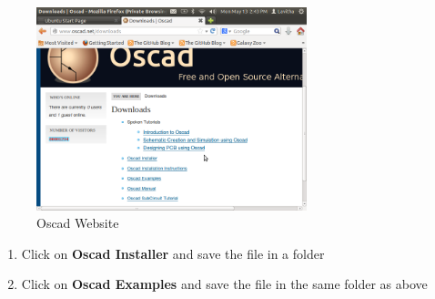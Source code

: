 \begin{figure}[h]
\centering
\includegraphics[width=0.7\textwidth]{figures/oscad1.png}
\caption{Oscad Website}
\label{fig: Oscad Website}
\end{figure}
\begin{enumerate}
\item Click on \textbf{Oscad Installer} and save the file in a folder
\item Click on \textbf{Oscad Examples} and save the file in the same folder as above
\end{enumerate}


